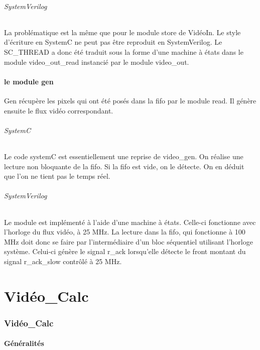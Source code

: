 {{\paragraph{SystemVerilog}
La problématique est la même que pour le module store de VidéoIn. 
Le style d'écriture en SystemC ne peut pas être reproduit en SystemVerilog.
Le SC\_THREAD a donc été traduit sous la forme d'une machine à états dans le module video\_out\_read instancié par le module video\_out.

\subsection{le module gen}
Gen récupère les pixels qui ont été posés dans la fifo par le module read.
Il génère ensuite le flux vidéo correspondant.

\paragraph{SystemC}
Le code systemC est essentiellement une reprise de video\_gen.
On réalise une lecture non bloquante de la fifo. 
Si la fifo est vide, on le détecte. 
On en déduit que l'on ne tient pas le temps réel.

\paragraph{SystemVerilog}
Le module est implémenté à l'aide d'une machine à états.
Celle-ci fonctionne avec l'horloge du flux vidéo, à 25 MHz.
La lecture dans la fifo, qui fonctionne à 100 MHz doit donc se faire
par l'intermédiaire d'un bloc séquentiel utilisant l'horloge système.
Celui-ci génère le signal r\_ack lorsqu'elle détecte le front montant
du signal r\_ack\_slow contrôlé à 25 MHz.


    \part{Vidéo\_Calc} 
    \section*{Vidéo\_Calc}
    
    \subsection{Généralités}
    
}}
